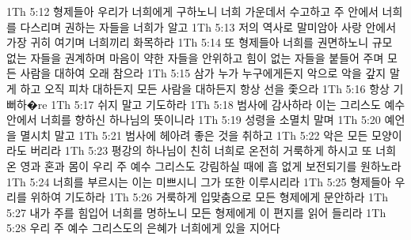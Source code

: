 1Th 5:12  형제들아 우리가 너희에게 구하노니 너희 가운데서 수고하고 주 안에서 너희를 다스리며 권하는 자들을 너희가 알고
1Th 5:13  저의 역사로 말미암아 사랑 안에서 가장 귀히 여기며 너희끼리 화목하라
1Th 5:14  또 형제들아 너희를 권면하노니 규모 없는 자들을 권계하며 마음이 약한 자들을 안위하고 힘이 없는 자들을 붙들어 주며 모든 사람을 대하여 오래 참으라
1Th 5:15  삼가 누가 누구에게든지 악으로 악을 갚지 말게 하고 오직 피차 대하든지 모든 사람을 대하든지 항상 선을 좇으라
1Th 5:16  항상 기뻐하�re
1Th 5:17  쉬지 말고 기도하라
1Th 5:18  범사에 감사하라 이는 그리스도 예수 안에서 너희를 향하신 하나님의 뜻이니라
1Th 5:19  성령을 소멸치 말며
1Th 5:20  예언을 멸시치 말고
1Th 5:21  범사에 헤아려 좋은 것을 취하고
1Th 5:22  악은 모든 모양이라도 버리라
1Th 5:23  평강의 하나님이 친히 너희로 온전히 거룩하게 하시고 또 너희 온 영과 혼과 몸이 우리 주 예수 그리스도 강림하실 때에 흠 없게 보전되기를 원하노라
1Th 5:24  너희를 부르시는 이는 미쁘시니 그가 또한 이루시리라
1Th 5:25  형제들아 우리를 위하여 기도하라
1Th 5:26  거룩하게 입맞춤으로 모든 형제에게 문안하라
1Th 5:27  내가 주를 힘입어 너희를 명하노니 모든 형제에게 이 편지를 읽어 들리라
1Th 5:28  우리 주 예수 그리스도의 은혜가 너희에게 있을 지어다


